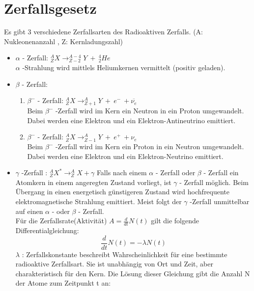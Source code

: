 \documentclass[Ex4_Zusammenfassung.tex]{subfiles}
\begin{document}
\section{Zerfallsgesetz}
Es gibt 3 verschiedene Zerfallsarten des Radioaktiven Zerfalls.  (A: Nukleonenanzahl , Z: Kernladungszahl)
\begin{itemize}
\item  $ \alpha $  - Zerfall:  $ ^{A}_{Z}X \rightarrow ^{A-4}_{Z-2}Y \ + \ ^{4}_{2}He $  \quad   \\ $ \alpha $ -Strahlung wird mittlels Heliumkernen vermittelt (positiv geladen). 
\item $ \beta $ - Zerfall: 
	\begin{enumerate} 
	\item $ \beta^{-} $ - Zerfall: $ ^{A}_{Z} X\rightarrow ^{A}_{Z+1} Y\ + \ e^{-} \ +\overline{\nu_{e}} $  \\ Beim  $ \beta^{-} $ -Zerfall wird im Kern ein Neutron in ein Proton umgewandelt. Dabei werden eine Elektron und ein Elektron-Antineutrino emittiert.
	\item $ \beta^{-} $ - Zerfall: $ ^{A}_{Z}X \rightarrow ^{A}_{Z-1}Y \ + \ e^{+} \ +\nu_{e} $ \\ Beim $ \beta^{-} $ -Zerfall wird im Kern ein Proton in ein Neutron umgewandelt. Dabei werden eine Elektron und ein Elektron-Neutrino emittiert.
	\end{enumerate}
\item $ \gamma $ -Zerfall :  $ ^{A}_{Z}X^{*} \rightarrow ^{A}_{Z}X + \gamma $ \newline Falls nach einem $ \alpha $ - Zerfall oder $ \beta $ - Zerfall ein Atomkern in einem angeregten Zustand vorliegt, ist $ \gamma $ - Zerfall möglich. Beim Übergang in einen energetisch günstigeren Zustand wird hochfrequente elektromagnetische Strahlung emittiert. Meist folgt der  $ \gamma $ -Zerfall unmittelbar auf einen $ \alpha $ - oder $ \beta $ - Zerfall. \\ 
\newline 
Für die Zerfallsrate(Aktivität) $ A = \frac{d}{dt} N(t)$  gilt die folgende Differentialgleichung: 
\begin{equation}
\frac{d}{dt} N(t) = - \lambda N(t) 
\end{equation}
$ \lambda $ : Zerfallskonstante beschreibt Wahrscheinlichkeit für eine bestimmte radioaktive Zerfallsart. Sie ist unabhängig von Ort und Zeit, aber charakteristisch für den Kern. \newline
Die Lösung dieser Gleichung gibt die Anzahl N der Atome zum Zeitpunkt t an: 

\end{itemize}
\end{document}
